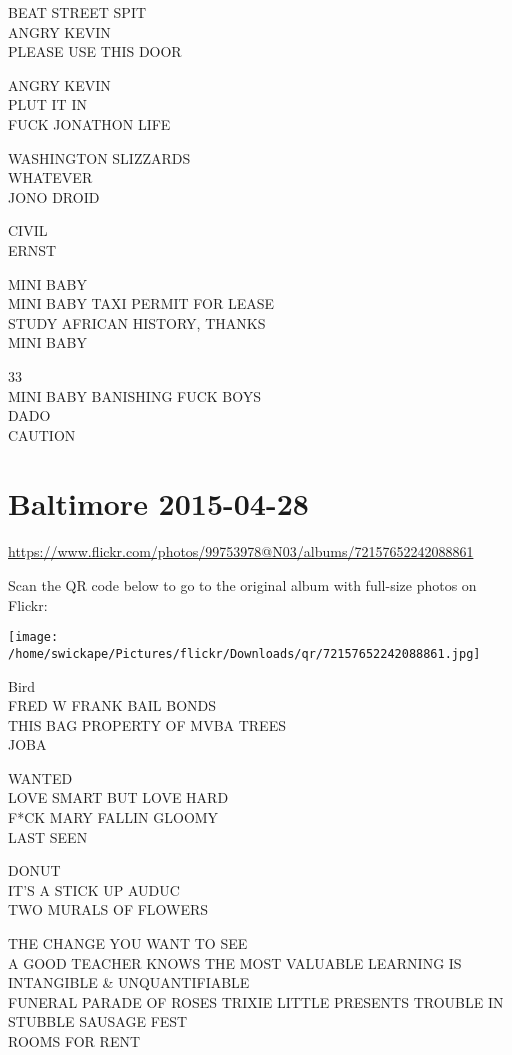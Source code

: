 \documentclass[10pt,letterpaper]{article}
\begin{document}
BEAT STREET SPIT\\
ANGRY KEVIN\\
PLEASE USE THIS DOOR

ANGRY KEVIN\\
PLUT IT IN\\
FUCK JONATHON LIFE

WASHINGTON SLIZZARDS\\
WHATEVER\\
JONO DROID

CIVIL\\
ERNST

MINI BABY\\
MINI BABY TAXI PERMIT FOR LEASE\\
STUDY AFRICAN HISTORY, THANKS\\
MINI BABY

33\\
MINI BABY BANISHING FUCK BOYS\\
DADO\\
CAUTION


\section*{Baltimore 2015-04-28}

\url{https://www.flickr.com/photos/99753978@N03/albums/72157652242088861}

Scan the QR code below to go to the original album with full-size photos on Flickr:

\texttt{[image: /home/swickape/Pictures/flickr/Downloads/qr/72157652242088861.jpg]}


Bird\\
FRED W FRANK BAIL BONDS\\
THIS BAG PROPERTY OF MVBA TREES\\
JOBA

WANTED\\
LOVE SMART BUT LOVE HARD\\
F*CK MARY FALLIN GLOOMY\\
LAST SEEN

DONUT\\
IT'S A STICK UP AUDUC\\
TWO MURALS OF FLOWERS

THE CHANGE YOU WANT TO SEE\\
A GOOD TEACHER KNOWS THE MOST VALUABLE LEARNING IS INTANGIBLE \& UNQUANTIFIABLE\\
FUNERAL PARADE OF ROSES TRIXIE LITTLE PRESENTS TROUBLE IN STUBBLE SAUSAGE FEST\\
ROOMS FOR RENT
\end{document}
